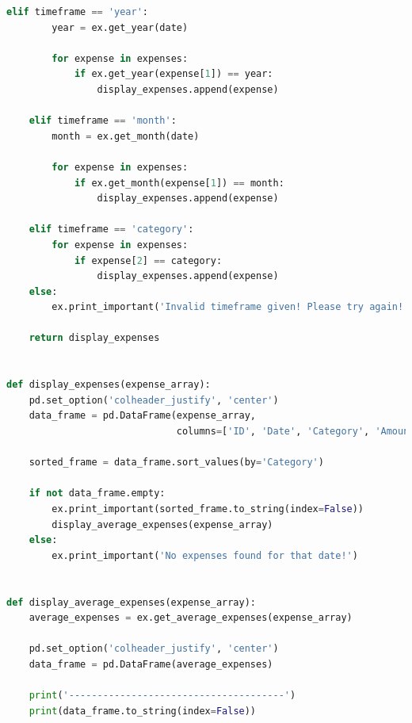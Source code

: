 \documentclass[11pt]{article}
\begin{document}
\begin{lstlisting}[language=Python, caption=Source code for \textit{expcli.py}.]
    elif timeframe == 'year':
        year = ex.get_year(date)

        for expense in expenses:
            if ex.get_year(expense[1]) == year:
                display_expenses.append(expense)

    elif timeframe == 'month':
        month = ex.get_month(date)

        for expense in expenses:
            if ex.get_month(expense[1]) == month:
                display_expenses.append(expense)

    elif timeframe == 'category':
        for expense in expenses:
            if expense[2] == category:
                display_expenses.append(expense)
    else:
        ex.print_important('Invalid timeframe given! Please try again!')

    return display_expenses


def display_expenses(expense_array):
    pd.set_option('colheader_justify', 'center')
    data_frame = pd.DataFrame(expense_array,
                              columns=['ID', 'Date', 'Category', 'Amount'])

    sorted_frame = data_frame.sort_values(by='Category')

    if not data_frame.empty:
        ex.print_important(sorted_frame.to_string(index=False))
        display_average_expenses(expense_array)
    else:
        ex.print_important('No expenses found for that date!')


def display_average_expenses(expense_array):
    average_expenses = ex.get_average_expenses(expense_array)

    pd.set_option('colheader_justify', 'center')
    data_frame = pd.DataFrame(average_expenses)

    print('--------------------------------------')
    print(data_frame.to_string(index=False))
  \end{lstlisting}
\end{document}
